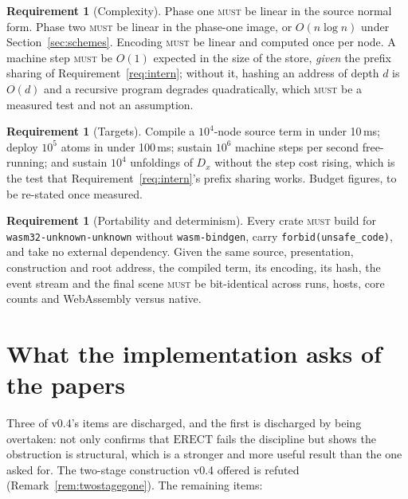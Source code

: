 \documentclass[11pt,a4paper]{article}
\newcommand{\code}[1]{\texttt{#1}}
\newcommand{\MUST}{\textsc{must}}
\newcommand{\ERECT}{\mathrm{ERECT}}
\theoremstyle{definition}
\newtheorem{requirement}[definition]{Requirement}
\theoremstyle{plain}
\begin{document}
\begin{requirement}[Complexity]\label{req:complexity}
Phase one \MUST{} be linear in the source normal form. Phase two \MUST{} be
linear in the phase-one image, or $O(n \log n)$ under
Section~\ref{sec:schemes}. Encoding \MUST{} be linear and computed once per
node. A machine step \MUST{} be $O(1)$ expected in the size of the store,
\emph{given} the prefix sharing of Requirement~\ref{req:intern}; without it,
hashing an address of depth $d$ is $O(d)$ and a recursive program degrades
quadratically, which \MUST{} be a measured test and not an assumption.
\end{requirement}

\begin{requirement}[Targets]\label{req:targets}
Compile a $10^{4}$-node source term in under 10\,ms; deploy $10^{5}$ atoms in
under 100\,ms; sustain $10^{6}$ machine steps per second free-running; and
sustain $10^{4}$ unfoldings of $D_{x}$ without the step cost rising, which is
the test that Requirement~\ref{req:intern}'s prefix sharing works. Budget
figures, to be re-stated once measured.
\end{requirement}

\begin{requirement}[Portability and determinism]\label{req:port}
Every crate \MUST{} build for \code{wasm32-unknown-unknown} without
\code{wasm-bindgen}, carry \code{forbid(unsafe\_code)}, and take no external
dependency. Given the same source, presentation, construction and root
address, the compiled term, its encoding, its hash, the event stream and the
final scene \MUST{} be bit-identical across runs, hosts, core counts and
WebAssembly versus native.
\end{requirement}

\section{What the implementation asks of the papers}\label{sec:paper}

Three of v0.4's items are discharged, and the first is discharged by being
overtaken: \cite[\S6.6]{draft3} not only confirms that $\ERECT$ fails the
discipline but shows the obstruction is structural, which is a stronger and
more useful result than the one asked for. The two-stage construction v0.4
offered is refuted (Remark~\ref{rem:twostagegone}). The remaining items:
\end{document}
